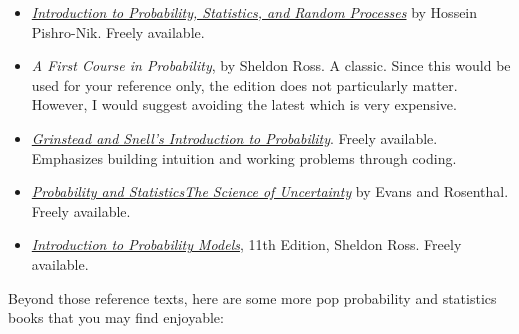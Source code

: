 \documentclass{article}
\begin{document}
\begin{itemize}
\item \emph{\href{https://www.probabilitycourse.com/}{Introduction to Probability, Statistics, and Random Processes}} by Hossein Pishro-Nik. Freely available.

\item \emph{A First Course in Probability}, by Sheldon Ross. A classic. Since this would be used for your reference only, the edition does not particularly matter. However, I would suggest avoiding the latest which is very expensive.

\item \emph{\href{https://math.dartmouth.edu/\~prob/prob/prob.pdf}{Grinstead and Snell's Introduction to Probability}}. Freely
available. Emphasizes building intuition and working problems through coding.

\item \emph{\href{http://www.utstat.toronto.edu/mikevans/jeffrosenthal/book.pdf}{Probability and StatisticsThe Science of Uncertainty}} by Evans and Rosenthal. Freely available.

\item \emph{\href{http://mitran-lab.amath.unc.edu/courses/MATH768/biblio/introduction-to-prob-models-11th-edition.PDF}{Introduction to Probability Models}}, 11th Edition, Sheldon Ross. Freely available.
\end{itemize}

\noindent Beyond those reference texts, here are some more pop probability and statistics books that you may find enjoyable:
\end{document}
